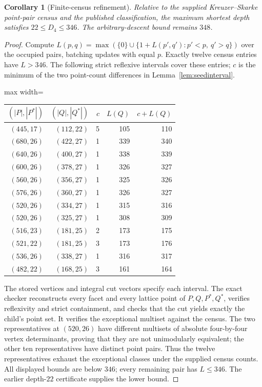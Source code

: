 \documentclass[manuscript]{aomart}
\newtheorem{corollary}[theorem]{Corollary}
\theoremstyle{definition}
\theoremstyle{remark}
\begin{document}
\begin{corollary}[Finite-census refinement]\label{cor:seed346}
Relative to the supplied Kreuzer--Skarke point-pair census and the
published classification, the maximum shortest depth satisfies
$22\le D_4\le346$. The arbitrary-descent bound remains $348$.
\end{corollary}
\begin{proof}
Compute $L(p,q)=\max(\{0\}\cup\{1+L(p',q'):p'<p,\ q'>q\})$
over the occupied pairs, batching updates with equal $p$.
Exactly twelve census entries have $L>346$. The following strict
reflexive intervals cover these entries; $c$ is the minimum of the
two point-count differences in Lemma~\ref{lem:seedinterval}.
\begin{center}\small
\begin{adjustbox}{max width=\linewidth}\begin{tabular}{rrrrr}\toprule
$(|P|,|P^*|)$ & $(|Q|,|Q^*|)$ & $c$ & $L(Q)$ & $c+L(Q)$\\\midrule
$(445,17)$ & $(112,22)$ & 5 & 105 & 110\\
$(680,26)$ & $(422,27)$ & 1 & 339 & 340\\
$(640,26)$ & $(400,27)$ & 1 & 338 & 339\\
$(600,26)$ & $(378,27)$ & 1 & 326 & 327\\
$(560,26)$ & $(356,27)$ & 1 & 325 & 326\\
$(576,26)$ & $(360,27)$ & 1 & 326 & 327\\
$(520,26)$ & $(334,27)$ & 1 & 315 & 316\\
$(520,26)$ & $(325,27)$ & 1 & 308 & 309\\
$(516,23)$ & $(181,25)$ & 2 & 173 & 175\\
$(521,22)$ & $(181,25)$ & 3 & 173 & 176\\
$(536,26)$ & $(338,27)$ & 1 & 316 & 317\\
$(482,22)$ & $(168,25)$ & 3 & 161 & 164\\
\bottomrule\end{tabular}\end{adjustbox}
\end{center}
The stored vertices and integral cut vectors specify each interval.
The exact checker reconstructs every facet and every lattice point of
$P,Q,P^*,Q^*$, verifies reflexivity and strict containment, and checks
that the cut yields exactly the child's point set. It verifies the
exceptional multiset against the census. The two representatives at
$(520,26)$ have different multisets of absolute four-by-four vertex
determinants, proving that they are not unimodularly equivalent; the
other ten representatives have distinct point pairs. Thus the twelve
representatives exhaust the exceptional classes under the supplied
census counts. All displayed bounds are below $346$; every remaining
pair has $L\le346$. The earlier depth-$22$ certificate supplies the
lower bound.
\end{proof}
\end{document}
